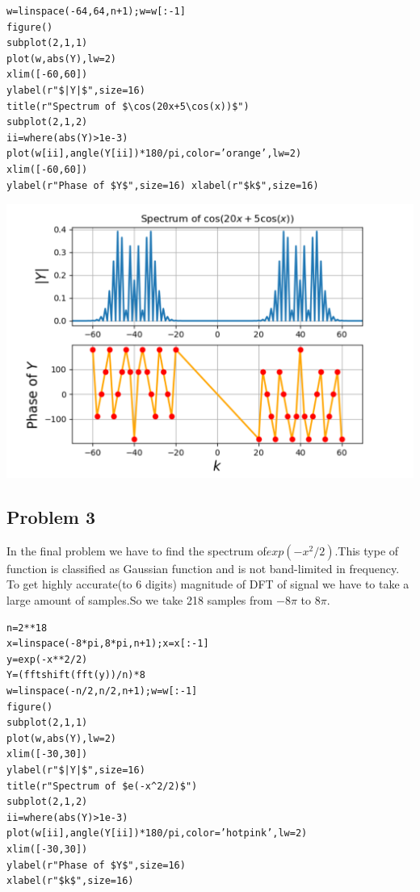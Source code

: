 \documentclass[10pt,english, openany]{book}
\begin{document}
\begin{verbatim}
w=linspace(-64,64,n+1);w=w[:-1]
figure()
subplot(2,1,1)
plot(w,abs(Y),lw=2)
xlim([-60,60])
ylabel(r"$|Y|$",size=16)
title(r"Spectrum of $\cos(20x+5\cos(x))$") 
subplot(2,1,2)
ii=where(abs(Y)>1e-3) 
plot(w[ii],angle(Y[ii])*180/pi,color=’orange’,lw=2) 
xlim([-60,60])
ylabel(r"Phase of $Y$",size=16) xlabel(r"$k$",size=16)
\end{verbatim}
{\centering \includegraphics[scale=0.3]{Figure3.png}}



\subsection{Problem 3}

In the final problem we have to find the spectrum of$ exp(-x^{2}/2 )$.This type
of function is classified as Gaussian function and is not band-limited in frequency.\\
To get highly accurate(to 6 digits) magnitude of DFT of signal we have to take a large amount of samples.So we take 218 samples from $-8\pi $ to $8\pi$.\\

\begin{verbatim}
n=2**18
x=linspace(-8*pi,8*pi,n+1);x=x[:-1]
y=exp(-x**2/2)
Y=(fftshift(fft(y))/n)*8 
w=linspace(-n/2,n/2,n+1);w=w[:-1]
figure()
subplot(2,1,1)
plot(w,abs(Y),lw=2)
xlim([-30,30])
ylabel(r"$|Y|$",size=16)
title(r"Spectrum of $e(-x^2/2)$")
subplot(2,1,2)
ii=where(abs(Y)>1e-3) 
plot(w[ii],angle(Y[ii])*180/pi,color=’hotpink’,lw=2) 
xlim([-30,30])
ylabel(r"Phase of $Y$",size=16) 
xlabel(r"$k$",size=16)
\end{verbatim}
\end{document}
